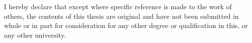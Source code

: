 \begin{declaration}

  I hereby declare that except where specific reference is made to the work of others,
  the contents of this thesis are original and have not been submitted in whole or in part for consideration for any other degree or qualification in this,
  or any other university.

\end{declaration}
